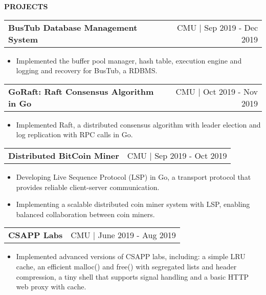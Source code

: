 \documentclass[letterpaper,11pt]{article}
\makeatletter
\newcommand{\resitem}[1]{\item  #1}
\newcommand{\resheading}[1]{{\large \colorbox{mygrey}{\begin{minipage}{\linewidth}{\textbf{#1 \vphantom{p\^{E}}}}\end{minipage}}}}
\newcommand{\ressubsubheading}[2]{
\begin{tabular*}{1.04\linewidth}{l@{\extracolsep{\fill}}r}
	\textbf{#1} & #2 \\
\end{tabular*}\vspace{-6pt}}
\makeatother
\begin{document}
\resheading{PROJECTS}
	\begin{description}
		\item
			\ressubsubheading{BusTub Database Management System}{CMU $|$ Sep 2019 - Dec 2019}
			{ \footnotesize
			\begin{itemize}
				\resitem{Implemented the buffer pool manager, hash table, execution engine and logging and recovery for BusTub, a RDBMS.}
			\end{itemize}
			}
		\item
			\ressubsubheading{GoRaft: Raft Consensus Algorithm in Go}{CMU $|$ Oct 2019 - Nov 2019}
				{ \footnotesize
				\begin{itemize}
					\resitem{Implemented Raft, a distributed consensus algorithm with leader election and log replication with RPC calls in Go.}
				\end{itemize}
				}
		\item
			\ressubsubheading{Distributed BitCoin Miner}{CMU $|$ Sep 2019 - Oct 2019}
			{ \footnotesize
			\begin{itemize}
				\resitem{Developing Live Sequence Protocol (LSP) in Go, a transport protocol that provides reliable client-server communication.}
				\resitem{Implementing a scalable distributed coin miner system with LSP, enabling balanced collaboration between coin miners.}

			\end{itemize}
			}
		\item
			\ressubsubheading{CSAPP Labs}{CMU $|$ June 2019 - Aug 2019}
			{ \footnotesize
			\begin{itemize}
				\resitem{Implemented advanced versions of CSAPP labs, including: a simple LRU cache, an efficient malloc() and free() with segregated lists and header compression, a tiny shell that supports signal handling and a basic HTTP web proxy with cache.}
			\end{itemize}
			}


\end{description}
\end{document}
